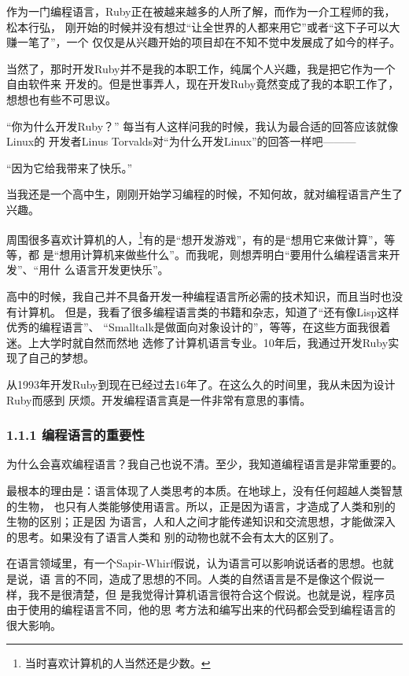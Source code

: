 \documentclass[11pt]{ctexart}
\begin{document}
作为一门编程语言，Ruby正在被越来越多的人所了解，而作为一介工程师的我，松本行弘，
刚开始的时候并没有想过“让全世界的人都来用它”或者“这下子可以大赚一笔了”，一个
仅仅是从兴趣开始的项目却在不知不觉中发展成了如今的样子。

当然了，那时开发Ruby并不是我的本职工作，纯属个人兴趣，我是把它作为一个自由软件来
开发的。但是世事弄人，现在开发Ruby竟然变成了我的本职工作了，想想也有些不可思议。

“你为什么开发Ruby？” 每当有人这样问我的时候，我认为最合适的回答应该就像Linux的
开发者Linus Torvalds对“为什么开发Linux”的回答一样吧———

“因为它给我带来了快乐。”

当我还是一个高中生，刚刚开始学习编程的时候，不知何故，就对编程语言产生了兴趣。

周围很多喜欢计算机的人，\footnote{当时喜欢计算机的人当然还是少数。}有的是“想开发游戏”，有的是“想用它来做计算”，等等，都
是“想用计算机来做些什么”。而我呢，则想弄明白“要用什么编程语言来开发”、“用什
么语言开发更快乐”。

高中的时候，我自己并不具备开发一种编程语言所必需的技术知识，而且当时也没有计算机。
但是，我看了很多编程语言类的书籍和杂志，知道了“还有像Lisp这样优秀的编程语言”、
“Smalltalk是做面向对象设计的”，等等，在这些方面我很着迷。上大学时就自然而然地
选修了计算机语言专业。10年后，我通过开发Ruby实现了自己的梦想。

从1993年开发Ruby到现在已经过去16年了。在这么久的时间里，我从未因为设计Ruby而感到
厌烦。开发编程语言真是一件非常有意思的事情。

\subsubsection{1.1.1 编程语言的重要性}
\label{sec:orgheadline1}

为什么会喜欢编程语言？我自己也说不清。至少，我知道编程语言是非常重要的。

最根本的理由是：语言体现了人类思考的本质。在地球上，没有任何超越人类智慧的生物，
也只有人类能够使用语言。所以，正是因为语言，才造成了人类和别的生物的区别；正是因
为语言，人和人之间才能传递知识和交流思想，才能做深入的思考。如果没有了语言人类和
别的动物也就不会有太大的区别了。

在语言领域里，有一个Sapir-Whirf假说，认为语言可以影响说话者的思想。也就是说，语
言的不同，造成了思想的不同。人类的自然语言是不是像这个假说一样，我不是很清楚，但
是我觉得计算机语言很符合这个假说。也就是说，程序员由于使用的编程语言不同，他的思
考方法和编写出来的代码都会受到编程语言的很大影响。
\end{document}
